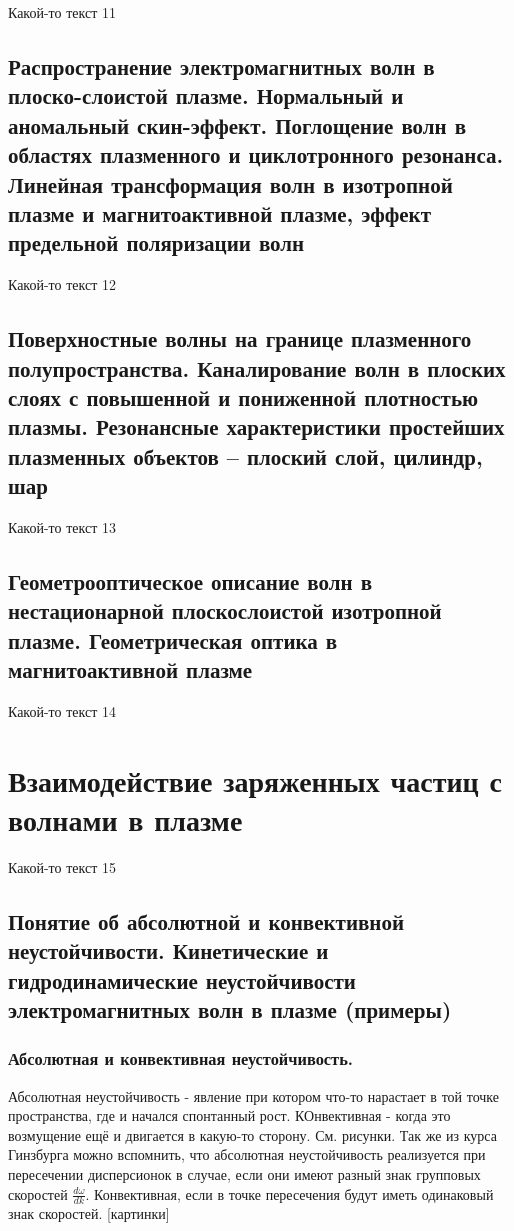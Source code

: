 \documentclass[10pt, a4paper]{article}
\let\stdsection\section
\renewcommand\section{\newpage\stdsection}
\begin{document}
Какой-то текст 11

\subsection{Распространение электромагнитных волн в плоско-слоистой плазме. Нормальный и аномальный скин-эффект. Поглощение волн в областях плазменного и циклотронного резонанса. Линейная трансформация волн в изотропной плазме и магнитоактивной плазме, эффект предельной поляризации волн}

Какой-то текст 12

\subsection{Поверхностные волны на границе плазменного полупространства. Каналирование волн в плоских слоях с повышенной и пониженной плотностью плазмы. Резонансные характеристики простейших плазменных объектов – плоский слой, цилиндр, шар}

Какой-то текст 13

\subsection{Геометрооптическое описание волн в нестационарной плоскослоистой изотропной плазме. Геометрическая оптика в магнитоактивной плазме}

Какой-то текст 14

\section{Взаимодействие заряженных частиц с волнами в плазме}

Какой-то текст 15

\subsection{Понятие об абсолютной и конвективной неустойчивости. Кинетические и гидродинамические неустойчивости электромагнитных волн в плазме (примеры)}

\subsubsection{Абсолютная и конвективная неустойчивость.}
Абсолютная неустойчивость - явление при котором что-то нарастает в той точке пространства, где и начался спонтанный рост. КОнвективная - когда это возмущение ещё и двигается в какую-то сторону. См. рисунки. Так же из курса Гинзбурга можно вспомнить, что абсолютная неустойчивость реализуется при пересечении дисперсионок в случае, если они имеют разный знак групповых скоростей $\frac {d\omega}{dk}$. Конвективная, если в точке пересечения будут иметь одинаковый знак скоростей.
[картинки]
\end{document}
